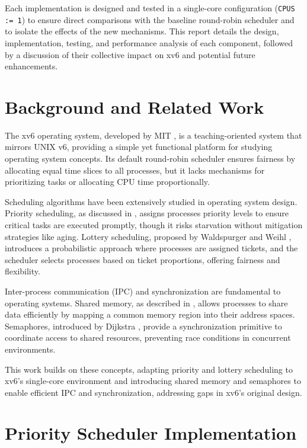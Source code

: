 \documentclass[12pt]{article}
\begin{document}
Each implementation is designed and tested in a single-core configuration (\texttt{CPUS := 1}) to ensure direct comparisons with the baseline round-robin scheduler and to isolate the effects of the new mechanisms. This report details the design, implementation, testing, and performance analysis of each component, followed by a discussion of their collective impact on xv6 and potential future enhancements.

\section{Background and Related Work}
\label{sec:background}

The xv6 operating system, developed by MIT \cite{xv6}, is a teaching-oriented system that mirrors UNIX v6, providing a simple yet functional platform for studying operating system concepts. Its default round-robin scheduler ensures fairness by allocating equal time slices to all processes, but it lacks mechanisms for prioritizing tasks or allocating CPU time proportionally.

Scheduling algorithms have been extensively studied in operating system design. Priority scheduling, as discussed in \cite{tanenbaum2008modern}, assigns processes priority levels to ensure critical tasks are executed promptly, though it risks starvation without mitigation strategies like aging. Lottery scheduling, proposed by Waldspurger and Weihl \cite{waldspurger1994lottery}, introduces a probabilistic approach where processes are assigned tickets, and the scheduler selects processes based on ticket proportions, offering fairness and flexibility.

Inter-process communication (IPC) and synchronization are fundamental to operating systems. Shared memory, as described in \cite{silberschatz2018operating}, allows processes to share data efficiently by mapping a common memory region into their address spaces. Semaphores, introduced by Dijkstra \cite{dijkstra1965cooperating}, provide a synchronization primitive to coordinate access to shared resources, preventing race conditions in concurrent environments.

This work builds on these concepts, adapting priority and lottery scheduling to xv6’s single-core environment and introducing shared memory and semaphores to enable efficient IPC and synchronization, addressing gaps in xv6’s original design.

\section{Priority Scheduler Implementation}
\label{sec:priority-scheduler}
\end{document}
